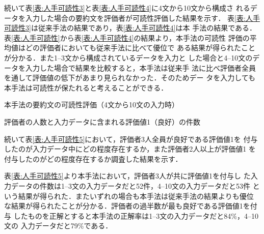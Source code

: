 \documentclass[japanese]{jnlp_1.4}
\begin{document}
\setlength{\tabcolsep}{0.5zw}
\setlength{\captionwidth}{200pt}
\begin{table}[b]
\begin{minipage}{200pt}
\label{表:人手可読性}

\end{minipage}
\hfill
\begin{minipage}{200pt}
\label{表:人手可読性2}

\end{minipage}
\end{table}

続いて表\ref{表:人手可読性3}と表\ref{表:人手可読性4}に4文から10文から構成さ
れるデータを入力した場合の要約文を評価者が可読性評価した結果を示す．
表\ref{表:人手可読性3}は従来手法の結果であり，表\ref{表:人手可読性4}は本
手法の結果である．
表\ref{表:人手可読性}から表\ref{表:人手可読性4}の結果より，本手法の可読性
評価の平均値はどの評価者においても従来手法に比べて優位で
ある結果が得られたことが分かる．また1--3文から構成されているデータを入力と
した場合と4--10文のデータを入力した場合で結果を比較すると，本手法は従来手
法に比べ評価者全員を通して評価値の低下があまり見られなかった．そのためデー
タを入力しても本手法は可読性が保たれると考えることができる．


\begin{table}[b]
\begin{minipage}{200pt}
\label{表:人手可読性3}

\end{minipage}
\hfill
\begin{minipage}{200pt}
\caption{本手法の要約文の可読性評価（4文から10文の入力時）} \label{表:人手可読性4}

\end{minipage}
\end{table}
\setlength{\tabcolsep}{1zw}
\begin{table}[b]
\caption{評価者の人数と入力データに含まれる評価値1（良好）の件数} \label{表:人手可読性5}

\end{table}


続いて表\ref{表:人手可読性5}において，評価者3人全員が良好である評価値1を
付与したのが入力データ中にどの程度存在するか，また評価者2人以上が評価値1
を付与したのがどの程度存在するか調査した結果を示す．

表\ref{表:人手可読性5}より本手法において，評価者3人が共に評価値1を付与し
た入力データの件数は1--3文の入力データだと52件，4--10文の入力データだと53件
という結果が得られた．またいずれの場合も本手法は従来手法の結果よりも優位
な結果が得られたことが分かる．評価者の過半数が最も良好である評価値1を付与
したものを正解とすると本手法の正解率は1--3文の入力データだと84\%，4--10文の
入力データだと79\%である．
\end{document}

